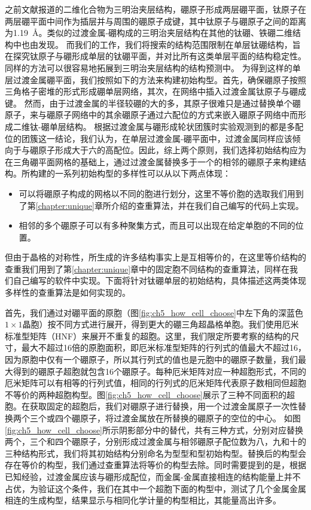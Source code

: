 之前文献报道的二维化合物为三明治夹层结构，硼原子形成两层硼平面，钛原子在两层硼平面中间作为插层并与周围的硼原子成键，其中钛原子与硼原子之间的距离为\SI{1.19}{\angstrom}。类似的过渡金属-硼构成的三明治夹层结构在其他的钛硼、铁硼二维结构中也由发现。
而我们的工作，我们将搜索的结构范围限制在单层钛硼结构，旨在探究钛原子与硼形成单层的钛硼平面，并对比所有这类单层平面的结构稳定性。
同样的方法可以很容易地拓展到三明治夹层结构的结构预测中。
为得到这样的单层过渡金属硼平面，我们按照如下的方法来构建初始构型。首先，确保硼原子按照三角格子密堆的形式形成硼单层网络，其次，在网络中插入过渡金属钛原子与硼成键。
然而，由于过渡金属的半径较硼的大的多，其原子很难只是通过替换单个硼原子，来与硼原子网络中的其余硼原子通过六配位的方式来嵌入硼原子网络中而形成二维钛-硼单层结构。
根据过渡金属与硼形成轮状团簇时实验观测到的都是多配位的团簇这一结论，我们认为，在单层过渡金属-硼平面中，过渡金属同样应该倾向于与硼原子形成大于六的高配位。因此，综上两个原则，我们选择初始结构应为在三角硼平面网格的基础上，通过过渡金属替换多于一个的相邻的硼原子来构建结构。所构建的一系列初始构型的多样性可以从以下两点体现：
\begin{itemize}
  \item 可以将硼原子构成的网格以不同的胞进行划分，这里不等价胞的选取我们用到了第\ref{chapter:unique}章所介绍的查重算法，并在我们自己编写的代码上实现。
  \item 相邻的多个硼原子可以有多种聚集方式，而且可以出现在给定单胞的不同的位置。
\end{itemize}
但由于晶格的对称性，所生成的许多结构事实上是互相等价的，在这里等价结构的查重我们用到了第\ref{chapter:unique}章中的固定胞不同结构的查重算法，同样在我们自己编写的软件中实现。下面将针对钛硼单层的初始结构，具体描述这两类体现多样性的查重算法是如何实现的。

首先，我们通过对硼平面的原胞（图\ref{fig:ch5_how_cell_choose}中左下角的深蓝色$1\times 1$晶胞）按不同方式进行展开，得到更大的硼三角超晶格单胞。我们使用厄米标准型矩阵（HNF）\cite{hart2008algorithm}来展开不重复的超胞。这里，我们限定所要考察的结构的尺寸，最大不超过\num{16}倍的原胞面积，即厄米标准型矩阵的行列式的值最大不超过\num{16}，因为原胞中仅有一个硼原子，所以其行列式的值也是元胞中的硼原子数量，我们最大得到的硼原子超胞就包含\num{16}个硼原子。每种厄米矩阵对应一种超胞形式，不同的厄米矩阵可以有相等的行列式值，相同的行列式的厄米矩阵代表原子数相同但超胞不等价的两种超胞构型。图\ref{fig:ch5_how_cell_choose}展示了三种不同面积的超胞。在获取固定的超胞后，我们对硼原子进行替换，用一个过渡金属原子一次性替换两个三个或四个硼原子，将过渡金属放在所替换的硼原子的空位的中心。
如图\ref{fig:ch5_how_cell_choose}所示阴影部分中的替代，共有三种方式，分别对应替换两个，三个和四个硼原子，分别形成过渡金属与相邻硼原子配位数为八，九和十的三种结构形式，我们将其初始结构分别命名为型型和型初始构型。替换后的构型会存在等价的构型，我们通过查重算法将等价的构型去除。同时需要提到的是，根据已知经验，过渡金属应该与硼形成配位，而金属-金属直接相连的结构能量上并不占优，为验证这个条件，我们在其中一个超胞下面的构型中，测试了几个金属金属相连的生成构型，结果显示与相同化学计量的构型相比，其能量高出许多。

